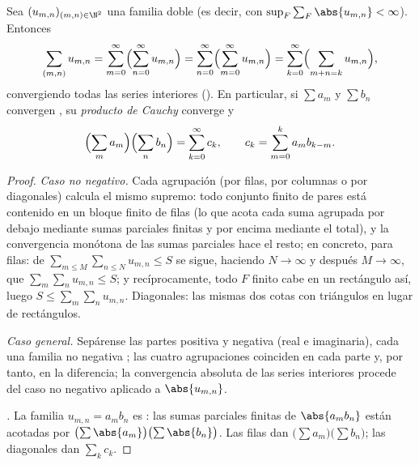 \begin{theorem}\label{thm:b2:series:fubini}
Sea $(u_{m,n})_{(m,n) \in \N^2}$ una familia doble  (es
decir, con $\sup_F \sum_F \abs{u_{m,n}} < \infty$).
Entonces
\[
\sum_{(m,n)} u_{m,n}
= \sum_{m=0}^{\infty}\Bigl(\sum_{n=0}^{\infty} u_{m,n}\Bigr)
= \sum_{n=0}^{\infty}\Bigl(\sum_{m=0}^{\infty} u_{m,n}\Bigr)
= \sum_{k=0}^{\infty}\Bigl(\sum_{m+n=k} u_{m,n}\Bigr),
\]
convergiendo todas las series interiores (). En
particular, si $\sum a_m$ y $\sum b_n$ convergen , su
\emph{producto de Cauchy} converge
 y
\[
\Bigl(\sum_m a_m\Bigr)\Bigl(\sum_n b_n\Bigr)
= \sum_{k=0}^{\infty} c_k,
\qquad
c_k = \sum_{m=0}^{k} a_m b_{k-m} .
\]
\end{theorem}

\begin{proof}
\emph{Caso no negativo.} Cada agrupación (por filas, por columnas o
por diagonales) calcula el mismo supremo: todo conjunto finito de
pares está contenido en un bloque finito de filas (lo que acota cada
suma agrupada por debajo mediante sumas parciales finitas y por
encima mediante el total), y la convergencia monótona de las sumas
parciales hace el resto; en concreto, para filas: de $\sum_{m \leq
M}\sum_{n \leq N} u_{m,n} \leq S$ se sigue, haciendo $N \to \infty$
y después $M \to \infty$, que $\sum_m \sum_n u_{m,n} \leq S$; y
recíprocamente, todo $F$ finito cabe en un rectángulo así, luego $S
\leq \sum_m\sum_n u_{m,n}$. Diagonales: las mismas dos cotas con
triángulos en lugar de rectángulos.

\emph{Caso general.} Sepárense las partes positiva y negativa (real
e imaginaria), cada una familia no negativa ; las cuatro
agrupaciones coinciden en cada parte y, por tanto, en la diferencia;
la convergencia absoluta de las series interiores procede del caso
no negativo aplicado a $\abs{u_{m,n}}$.

\emph{.} La familia $u_{m,n} = a_m b_n$ es
: las sumas parciales finitas de $\abs{a_mb_n}$ están
acotadas por $\bigl(\sum\abs{a_m}\bigr)\bigl(\sum\abs{b_n}\bigr)$.
Las filas dan $\bigl(\sum a_m\bigr)\bigl(\sum b_n\bigr)$; las
diagonales dan $\sum_k c_k$.
\end{proof}

